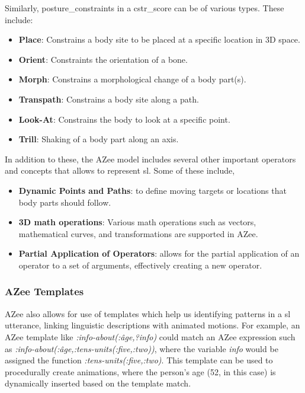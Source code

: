 \documentclass[../../main.tex]{subfiles}
\begin{document}
Similarly, \gls{posture_constraint}s in a \gls{cstr_score} can be of various types. These include:

\begin{itemize}
  \item \textbf{Place}: Constrains a body \gls{site} to be placed at a specific location in 3D space.
  \item \textbf{Orient}: Constraints the orientation of a bone.
  \item \textbf{Morph}: Constrains a morphological change of a body part(s).
  \item \textbf{Transpath}: Constrains a body \gls{site} along a path.
  \item \textbf{Look-At}: Constrains the body to look at a specific point.
  \item \textbf{Trill}: Shaking of a body part along an axis.
\end{itemize}

In addition to these, the AZee model includes several other important operators and concepts that allows to represent \gls{sl}. Some of these include,

\begin{itemize}
  \item \textbf{Dynamic Points and Paths}: to define moving targets or locations that body parts should follow.
  \item \textbf{3D math operations}: Various math operations such as vectors, mathematical curves, and transformations are supported in AZee.
  \item \textbf{Partial Application of Operators}: allows for the partial application of an operator to a set of arguments, effectively creating a new operator.
\end{itemize}

\subsubsection{AZee Templates}
\label{ch:background_work:sign_language_descriptions:azee:templates}

AZee also allows for use of templates which help us identifying patterns in a \gls{sl} utterance, linking linguistic descriptions with animated motions. For example, an AZee template like \emph{:info-about(:âge,?info)} could match an AZee expression such as \emph{:info-about(:âge,:tens-units(:five,:two))}, where the variable \emph{info} would be assigned the function \emph{:tens-units(:five,:two)}. This template can be used to procedurally create animations, where the person's age (52, in this case) is dynamically inserted based on the template match.
\end{document}

